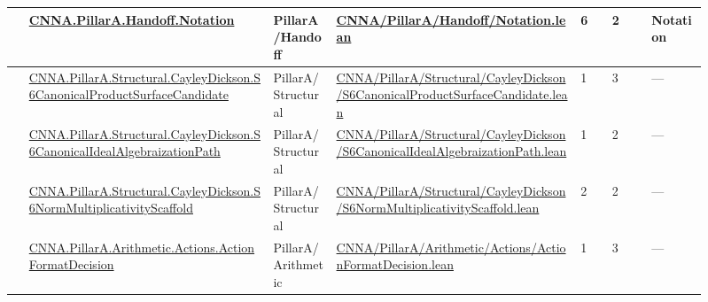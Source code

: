 \begin{longtable}{L{0.025\linewidth} L{0.315\linewidth} L{0.08\linewidth} L{0.315\linewidth} L{0.045\linewidth} L{0.055\linewidth} L{0.07\linewidth}}
\hline
{} & \href{run:repo_snapshot/CNNA/PillarA/Handoff/Notation.lean}{CNNA.\allowbreak{}PillarA.\allowbreak{}Handoff.\allowbreak{}Notation} & PillarA/\allowbreak{}Handoff & \href{run:repo_snapshot/CNNA/PillarA/Handoff/Notation.lean}{CNNA/\allowbreak{}PillarA/\allowbreak{}Handoff/\allowbreak{}Notation.\allowbreak{}lean} & 6 & 2 & Notation\\
\hline
{} & \href{run:repo_snapshot/CNNA/PillarA/Structural/CayleyDickson/S6CanonicalProductSurfaceCandidate.lean}{CNNA.\allowbreak{}PillarA.\allowbreak{}Structural.\allowbreak{}CayleyDickson.\allowbreak{}S6CanonicalProductSurfaceCandidate} & PillarA/\allowbreak{}Structural & \href{run:repo_snapshot/CNNA/PillarA/Structural/CayleyDickson/S6CanonicalProductSurfaceCandidate.lean}{CNNA/\allowbreak{}PillarA/\allowbreak{}Structural/\allowbreak{}CayleyDickson/\allowbreak{}S6CanonicalProductSurfaceCandidate.\allowbreak{}lean} & 1 & 3 & ---\\
\hline
{} & \href{run:repo_snapshot/CNNA/PillarA/Structural/CayleyDickson/S6CanonicalIdealAlgebraizationPath.lean}{CNNA.\allowbreak{}PillarA.\allowbreak{}Structural.\allowbreak{}CayleyDickson.\allowbreak{}S6CanonicalIdealAlgebraizationPath} & PillarA/\allowbreak{}Structural & \href{run:repo_snapshot/CNNA/PillarA/Structural/CayleyDickson/S6CanonicalIdealAlgebraizationPath.lean}{CNNA/\allowbreak{}PillarA/\allowbreak{}Structural/\allowbreak{}CayleyDickson/\allowbreak{}S6CanonicalIdealAlgebraizationPath.\allowbreak{}lean} & 1 & 2 & ---\\
\hline
{} & \href{run:repo_snapshot/CNNA/PillarA/Structural/CayleyDickson/S6NormMultiplicativityScaffold.lean}{CNNA.\allowbreak{}PillarA.\allowbreak{}Structural.\allowbreak{}CayleyDickson.\allowbreak{}S6NormMultiplicativityScaffold} & PillarA/\allowbreak{}Structural & \href{run:repo_snapshot/CNNA/PillarA/Structural/CayleyDickson/S6NormMultiplicativityScaffold.lean}{CNNA/\allowbreak{}PillarA/\allowbreak{}Structural/\allowbreak{}CayleyDickson/\allowbreak{}S6NormMultiplicativityScaffold.\allowbreak{}lean} & 2 & 2 & ---\\
\hline
{} & \href{run:repo_snapshot/CNNA/PillarA/Arithmetic/Actions/ActionFormatDecision.lean}{CNNA.\allowbreak{}PillarA.\allowbreak{}Arithmetic.\allowbreak{}Actions.\allowbreak{}ActionFormatDecision} & PillarA/\allowbreak{}Arithmetic & \href{run:repo_snapshot/CNNA/PillarA/Arithmetic/Actions/ActionFormatDecision.lean}{CNNA/\allowbreak{}PillarA/\allowbreak{}Arithmetic/\allowbreak{}Actions/\allowbreak{}ActionFormatDecision.\allowbreak{}lean} & 1 & 3 & ---\\

\end{longtable}
